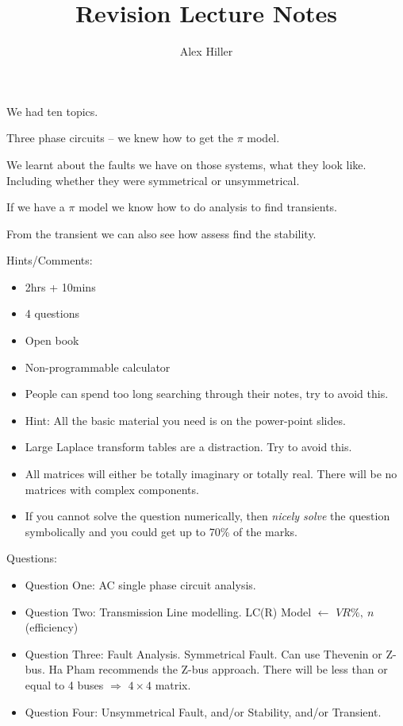 \documentclass{article}
\author{Alex Hiller}
\title{Revision Lecture Notes}
\begin{document}
\maketitle

We had ten topics.

Three phase circuits -- we knew how to get the $\pi$ model.

We learnt about the faults we have on those systems, what they look like. Including whether they were symmetrical or unsymmetrical.

If we have a $\pi$ model we know how to do analysis to find transients. 

From the transient we can also see how assess find the stability. 

Hints/Comments:
\begin{itemize}
  \item 2hrs + 10mins    
  \item 4 questions
  \item Open book
  \item Non-programmable calculator
  \item People can spend too long searching through their notes, try to avoid this.
  \item Hint: All the basic material you need is on the power-point slides.
  \item Large Laplace transform tables are a distraction. Try to avoid this.
  \item All matrices will either be totally imaginary or totally real. There will be no matrices with complex components. 
  \item If you cannot solve the question numerically, then \textit{nicely solve} the question symbolically and you could get up to 70\% of the marks.
\end{itemize}

Questions:
\begin{itemize}
  \item Question One: AC single phase circuit analysis.
  \item Question Two: Transmission Line modelling. LC(R) Model $\leftarrow$ $VR \%, \ n$ (efficiency) 
  \item Question Three: Fault Analysis. Symmetrical Fault. Can use Thevenin or Z-bus. Ha Pham recommends the Z-bus approach. There will be less than or equal to 4 buses $\Rightarrow$ $4 \times 4$ matrix. 
  \item Question Four: Unsymmetrical Fault, and/or Stability, and/or Transient.
\end{itemize}

\end{document}
